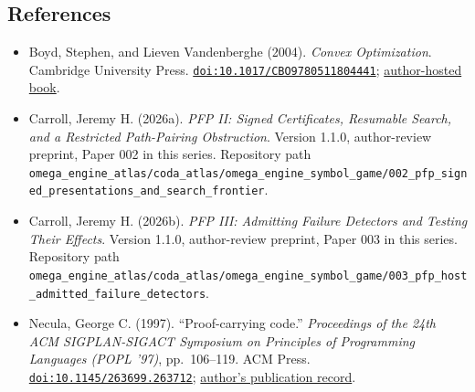 \documentclass[
  11pt,
]{article}
\providecommand{\tightlist}{%
  \setlength{\itemsep}{0pt}\setlength{\parskip}{0pt}}
\begin{document}
\subsection{References}\label{references}

\begin{itemize}
\tightlist
\item
  Boyd, Stephen, and Lieven Vandenberghe (2004). \emph{Convex
  Optimization}. Cambridge University Press.
  \href{https://doi.org/10.1017/CBO9780511804441}{\nolinkurl{doi:10.1017/CBO9780511804441}};
  \href{https://web.stanford.edu/~boyd/cvxbook/}{author-hosted book}.
\item
  Carroll, Jeremy H. (2026a). \emph{PFP II: Signed Certificates,
  Resumable Search, and a Restricted Path-Pairing Obstruction}. Version
  1.1.0, author-review preprint, Paper 002 in this series. Repository
  path
  \nolinkurl{omega_engine_atlas/coda_atlas/omega_engine_symbol_game/002_pfp_signed_presentations_and_search_frontier}.
\item
  Carroll, Jeremy H. (2026b). \emph{PFP III: Admitting Failure Detectors
  and Testing Their Effects}. Version 1.1.0, author-review preprint,
  Paper 003 in this series. Repository path
  \nolinkurl{omega_engine_atlas/coda_atlas/omega_engine_symbol_game/003_pfp_host_admitted_failure_detectors}.
\item
  Necula, George C. (1997). ``Proof-carrying code.'' \emph{Proceedings
  of the 24th ACM SIGPLAN-SIGACT Symposium on Principles of Programming
  Languages (POPL '97)}, pp.~106--119. ACM Press.
  \href{https://doi.org/10.1145/263699.263712}{\nolinkurl{doi:10.1145/263699.263712}};
  \href{https://people.eecs.berkeley.edu/~necula/papers.html}{author's
  publication record}.
\end{itemize}
\end{document}
